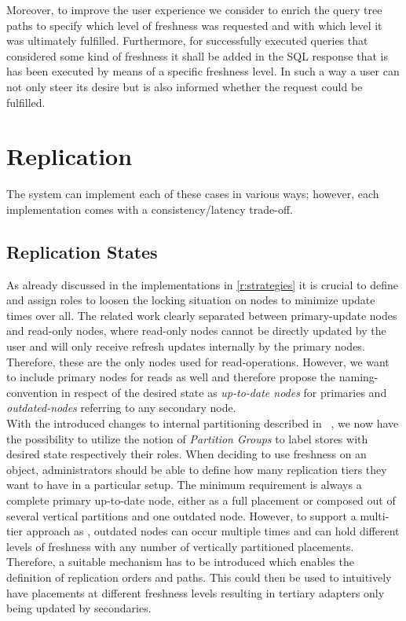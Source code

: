 Moreover, to improve the user experience we consider to enrich the query tree paths to specify which level of freshness was requested and with which level it was 
ultimately fulfilled. Furthermore, for successfully executed queries that considered some kind of freshness it shall be added in the SQL response that is has been 
executed by means of a specific freshness level.
In such a way a user can not only steer its desire but is also informed whether the request could be fulfilled.



\section{Replication}
\label{sec:replication}

The system can implement each of these cases in various ways; however, each implementation comes with a consistency/latency trade-off.

\subsection{Replication States}
\label{sec:state}

As already discussed in the implementations in \ref{r:strategies} it is crucial to define and assign roles to loosen the locking situation on nodes
to minimize update times over all. The related work clearly separated between primary-update nodes and read-only nodes, where 
read-only nodes cannot be directly updated by the user and will only receive refresh updates internally by the primary nodes.
Therefore, these are the only nodes used for read-operations. 
However, we want to include primary nodes for reads as well and therefore propose the naming-convention in respect of the desired state as \emph{up-to-date nodes} for primaries
and \emph{outdated-nodes} referring to any secondary node. \\
With the introduced changes to internal partitioning described in ~\cite{hennemann_2021}, we now have the possibility to utilize the notion of \emph{Partition Groups}
to label stores with desired state respectively their roles.  
When deciding to use freshness on an object, administrators should be able to define how many replication tiers they want to have in a particular setup.
The minimum requirement is always a complete primary up-to-date node, either as a full placement or composed out of several vertical partitions and one outdated node.  
However, to support a multi-tier approach as \cite{voicu:2010}, outdated nodes can occur multiple times and can hold different levels of freshness with any number of vertically partitioned
placements. Therefore, a suitable mechanism has to be introduced which enables the definition of replication orders and paths. This could then be used to 
intuitively have placements at different freshness levels resulting in tertiary adapters only being updated by secondaries.\\



